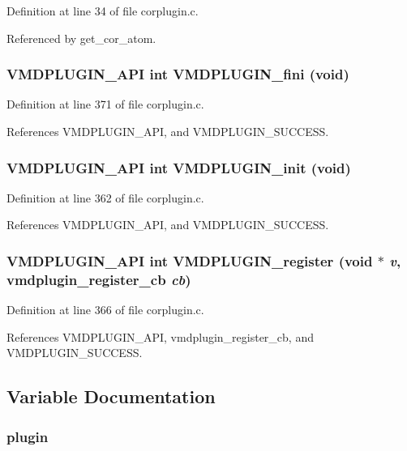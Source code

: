 Definition at line 34 of file corplugin.c.

Referenced by get\_\-cor\_\-atom.
\subsubsection{\setlength{\rightskip}{0pt plus 5cm}VMDPLUGIN\_\-API int VMDPLUGIN\_\-fini (void)}\label{corplugin_8c_a12}




Definition at line 371 of file corplugin.c.

References VMDPLUGIN\_\-API, and VMDPLUGIN\_\-SUCCESS.
\subsubsection{\setlength{\rightskip}{0pt plus 5cm}VMDPLUGIN\_\-API int VMDPLUGIN\_\-init (void)}\label{corplugin_8c_a10}




Definition at line 362 of file corplugin.c.

References VMDPLUGIN\_\-API, and VMDPLUGIN\_\-SUCCESS.
\subsubsection{\setlength{\rightskip}{0pt plus 5cm}VMDPLUGIN\_\-API int VMDPLUGIN\_\-register (void $\ast$ {\em v}, {\bf vmdplugin\_\-register\_\-cb} {\em cb})}\label{corplugin_8c_a11}




Definition at line 366 of file corplugin.c.

References VMDPLUGIN\_\-API, vmdplugin\_\-register\_\-cb, and VMDPLUGIN\_\-SUCCESS.

\subsection{Variable Documentation}
\subsubsection{ plugin\hspace{0.3cm}{\tt  [static]}}\label{corplugin_8c_a1}


